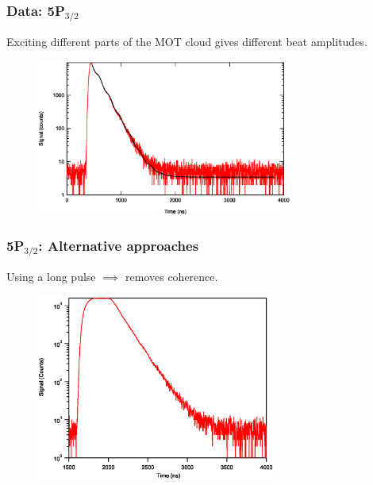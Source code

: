 \documentclass{beamer}
\theoremstyle{definition}
\begin{document}
\begin{frame}
\frametitle{Data: 5P$_{\text{3/2}}$}

Exciting different parts of the MOT cloud gives different beat amplitudes.


\begin{figure}[!htb]
	\centering
	\includegraphics[width=0.75\textwidth]{big_beats_2.eps}
\end{figure}

\end{frame}






\begin{frame}
\frametitle{5P$_{\text{3/2}}$: Alternative approaches}

Using a long pulse $\implies$ removes coherence.

\begin{figure}[!htb]
	\centering
	\includegraphics[width=0.7\textwidth]{long_pulse.eps}
\end{figure}




\end{frame}
\end{document}
